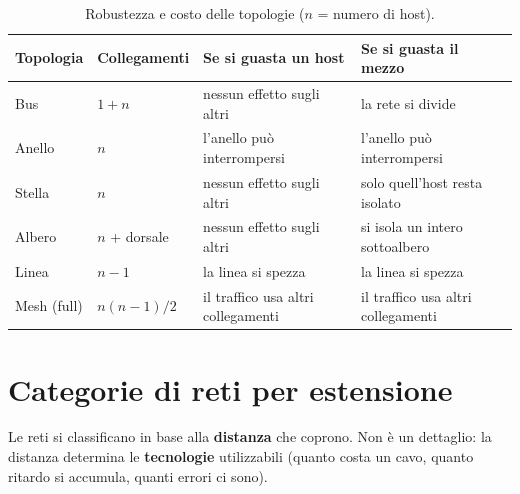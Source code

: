 \begin{table}[H]
\centering
\begin{tabular}{llp{4cm}p{4.2cm}}
\toprule
\textbf{Topologia} & \textbf{Collegamenti} & \textbf{Se si guasta un host} & \textbf{Se si guasta il mezzo} \\
\midrule
Bus & $1+n$ & nessun effetto sugli altri & la rete si divide \\
Anello & $n$ & l'anello può interrompersi & l'anello può interrompersi \\
Stella & $n$ & nessun effetto sugli altri & solo quell'host resta isolato \\
Albero & $n$ + dorsale & nessun effetto sugli altri & si isola un intero sottoalbero \\
Linea & $n-1$ & la linea si spezza & la linea si spezza \\
Mesh (full) & $n(n-1)/2$ & il traffico usa altri collegamenti & il traffico usa altri collegamenti \\
\bottomrule
\end{tabular}
\caption{Robustezza e costo delle topologie ($n$ = numero di host).}
\end{table}



\section{Categorie di reti per estensione}

Le reti si classificano in base alla \textbf{distanza} che coprono. Non è un dettaglio: la distanza
determina le \textbf{tecnologie} utilizzabili (quanto costa un cavo, quanto ritardo si accumula,
quanti errori ci sono).

